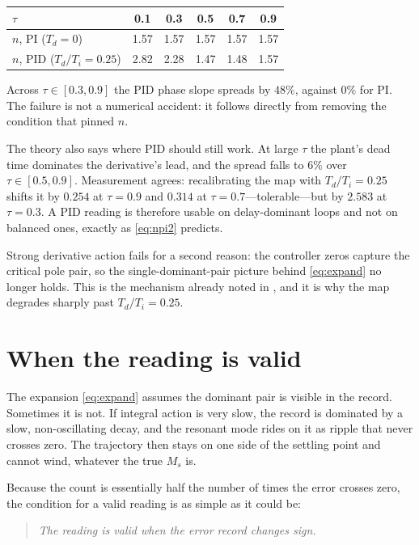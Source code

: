 \documentclass[final,3p,times,twocolumn]{elsarticle}
\begin{document}
\begin{center}
\begin{tabular}{lccccc}
\toprule
$\tau$ & 0.1 & 0.3 & 0.5 & 0.7 & 0.9 \\
\midrule
$n$, PI ($T_d=0$)   & 1.57 & 1.57 & 1.57 & 1.57 & 1.57 \\
$n$, PID ($T_d/T_i=0.25$) & 2.82 & 2.28 & 1.47 & 1.48 & 1.57 \\
\bottomrule
\end{tabular}
\end{center}

Across $\tau\in[0.3,0.9]$ the PID phase slope spreads by $48\%$, against
$0\%$ for PI. The failure is not a numerical accident: it follows
directly from removing the condition that pinned $n$.

The theory also says where PID should still work. At large $\tau$ the
plant's dead time dominates the derivative's lead, and the spread falls
to $6\%$ over $\tau\in[0.5,0.9]$. Measurement agrees: recalibrating the
map with $T_d/T_i=0.25$ shifts it by $0.254$ at $\tau=0.9$ and $0.314$
at $\tau=0.7$---tolerable---but by $2.583$ at $\tau=0.3$. A PID reading
is therefore usable on delay-dominant loops and not on balanced ones,
exactly as \eqref{eq:npi2} predicts.

Strong derivative action fails for a second reason: the controller zeros
capture the critical pole pair, so the single-dominant-pair picture
behind \eqref{eq:expand} no longer holds. This is the mechanism already
noted in \cite[Rem.~3]{SPIN}, and it is why the map degrades sharply
past $T_d/T_i=0.25$.

\section{When the reading is valid}
\label{sec:valid}

The expansion \eqref{eq:expand} assumes the dominant pair is visible in
the record. Sometimes it is not. If integral action is very slow, the record
is dominated by a slow, non-oscillating decay, and the resonant mode
rides on it as ripple that never crosses zero. The trajectory then stays
on one side of the settling point and cannot wind, whatever the true
$M_s$ is.

Because the count is essentially half the number of times the error
crosses zero, the condition for a valid reading is as simple as it could
be:

\begin{quote}
\emph{The reading is valid when the error record changes sign.}
\end{quote}
\end{document}
